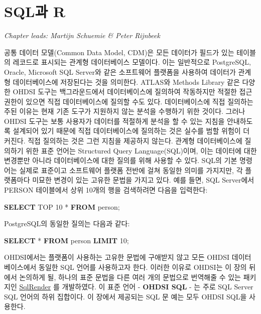 \documentclass[11pt]{book}
\newenvironment{Shaded}{\begin{snugshade}}{\end{snugshade}}
\newcommand{\KeywordTok}[1]{\textcolor[rgb]{0.13,0.29,0.53}{\textbf{#1}}}
\newcommand{\DecValTok}[1]{\textcolor[rgb]{0.00,0.00,0.81}{#1}}
\newcommand{\NormalTok}[1]{#1}
\theoremstyle{definition}
\theoremstyle{definition}
\theoremstyle{definition}
\theoremstyle{remark}
\begin{document}
\chapter{SQL과 R}\label{SqlAndR}

\emph{Chapter leads: Martijn Schuemie \& Peter Rijnbeek}

공통 데이터 모델(Common Data Model, CDM)은 모든 데이터가 필드가 있는
테이블의 레코드로 표시되는 관계형 데이터베이스 모델이다. 이는 일반적으로
PostgreSQL, Oracle, Microsoft SQL Server와 같은 소프트웨어 플랫폼을
사용하여 데이터가 관계형 데이터베이스에 저장된다는 것을 의미한다.
ATLAS와 Methods Library 같은 다양한 OHDSI 도구는 백그라운드에서
데이터베이스에 질의하여 작동하지만 적절한 접근 권한이 있으면 직접
데이터베이스에 질의할 수도 있다. 데이터베이스에 직접 질의하는 주된
이유는 현재 기존 도구가 지원하지 않는 분석을 수행하기 위한 것이다.
그러나 OHDSI 도구는 보통 사용자가 데이터를 적절하게 분석을 할 수 있는
지침을 안내하도록 설계되어 있기 때문에 직접 데이터베이스에 질의하는 것은
실수를 범할 위험이 더 커진다. 직접 질의하는 것은 그런 지침을 제공하지
않는다. 관계형 데이터베이스에 질의하기 위한 표준 언어는 Structured Query
Language(SQL)이며, 이는 데이터에 대한 변경뿐만 아니라 데이터베이스에
대한 질의를 위해 사용할 수 있다. SQL의 기본 명령어는 실제로 표준이고
소프트웨어 플랫폼 전반에 걸쳐 동일한 의미를 가지지만, 각 플랫폼마다
미묘한 변경이 있는 고유한 문법을 가지고 있다. 예를 들면, SQL Server에서
PERSON 테이블에서 상위 10개의 행을 검색하려면 다음을 입력한다:
 

\begin{Shaded}
\begin{Highlighting}[]
\KeywordTok{SELECT}\NormalTok{ TOP }\DecValTok{10}\NormalTok{ * }\KeywordTok{FROM}\NormalTok{ person;}
\end{Highlighting}
\end{Shaded}

PostgreSQL의 동일한 질의는 다음과 같다:

\begin{Shaded}
\begin{Highlighting}[]
\KeywordTok{SELECT}\NormalTok{ * }\KeywordTok{FROM}\NormalTok{ person }\KeywordTok{LIMIT} \DecValTok{10}\NormalTok{;}
\end{Highlighting}
\end{Shaded}

OHDSI에서는 플랫폼이 사용하는 고유한 문법에 구애받지 않고 모든 OHDSI
데이터베이스에서 동일한 SQL 언어를 사용하고자 한다. 이러한 이유로
OHDSI는 이 장의 뒤에서 논의하게 될, 하나의 표준 문법을 다른 여러 개의
문법으로 번역해줄 수 있는 패키지인
\href{https://ohdsi.github.io/SqlRender/}{SqlRender} 를 개발하였다. 이
표준 언어 - \textbf{OHDSI SQL} - 는 주로 SQL Server SQL 언어의 하위
집합이다. 이 장에서 제공되는 SQL 문 예는 모두 OHDSI SQL을 사용한다.
 
\end{document}
